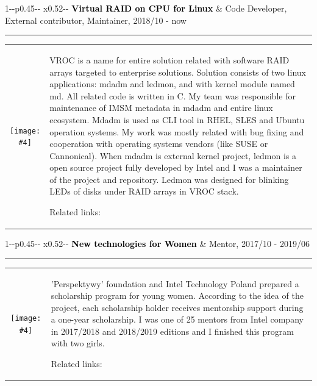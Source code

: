 \documentclass[10pt,A4]{article}
\newcommand{\mpwidth}{\linewidth-\fboxsep-\fboxsep}
\newcommand{\portfolioitem}[7]
{
\vspace{8pt}
	\begin{tabular*}{1\mpwidth}{p{0.45\mpwidth}  x{0.52\mpwidth}}
 	\textcolor{black}{\textbf{#2}} & \textcolor{complcol}{#3}, \textcolor{bgcol}{#1}

	\end{tabular*}
\vspace{-12pt}
\textcolor{softcol}{\hrule}
\vspace{5pt}
  \begin{tabular}{ c m{13cm} }
    \begin{minipage}{.3\textwidth}
      \texttt{[image: \#4]}
    \end{minipage}
    & #6

Related links: #7 \\
  \end{tabular}
}
\newcommand{\portfoliohref}[2]{
\href[pdfnewwindow=true]{#1}{\color{complcol}{#2}}
}
\begin{document}
\portfolioitem{2018/10 - now}{Virtual RAID on CPU for Linux}{Code Developer, External contributor, Maintainer}{img/vroc.jpg}{1.0}
{VROC is a name for entire solution related with software RAID arrays targeted to enterprise solutions. Solution consists of two linux applications: mdadm and ledmon, and with kernel module named md. All related code is written in C. My team was responsible for maintenance of IMSM metadata in mdadm and entire linux ecosystem. Mdadm is used as CLI tool in RHEL, SLES and Ubuntu operation systems. My work was mostly related with bug fixing and cooperation with operating systems vendors (like SUSE or Cannonical). When mdadm is external kernel project, ledmon is a open source project fully developed by Intel and I was a maintainer of the project and repository. Ledmon was designed for blinking LEDs of disks under RAID arrays in VROC stack.}
{\portfoliohref{https://github.com/intel/ledmon/commits?author=mzylowski}{My ledmon commits} | \portfoliohref{https://git.kernel.org/pub/scm/linux/kernel/git/torvalds/linux.git/commit/scripts/checkpatch.pl?id=6ad724e2a48fc24dd9788490d85a3490cb0117c1}{Linux kernel patch} | \portfoliohref{https://git.kernel.org/pub/scm/utils/mdadm/mdadm.git/log/?qt=grep\&q=Michal+Zylowski}{My mdadm patches}}

\portfolioitem{2017/10 - 2019/06}{New technologies for Women}{Mentor}{img/ntdd.png}{0.8}
{'Perspektywy' foundation and Intel Technology Poland prepared a scholarship program for young women. According to the idea of the project, each scholarship holder receives mentorship support during a one-year scholarship. I was one of 25 mentors from Intel company in 2017/2018 and 2018/2019 editions and I finished this program with two girls.}
{\portfoliohref{https://www.stypendiadladziewczyn.pl/pl/intelligent-technologies-new-perspectives-for-young-women}{Scholarship program site}}



%
%
%
%
%
%
\end{document}
